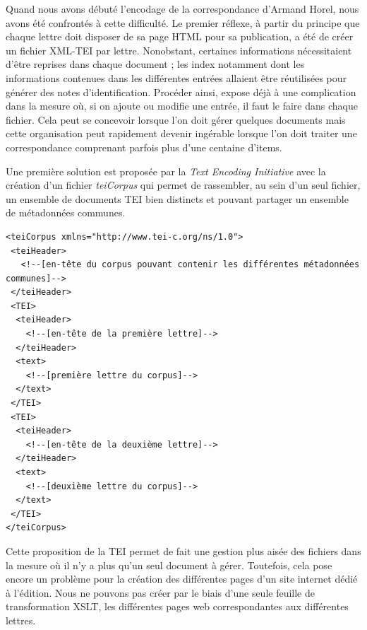 \documentclass[12pt,a4paper]{book} %
\begin{document}
Quand nous avons débuté l'encodage de la correspondance d'Armand Horel, nous avons été confrontés à cette difficulté. Le premier réflexe, à partir du principe  que chaque lettre doit disposer de sa page HTML pour sa publication, a été de créer un fichier XML-TEI par lettre. Nonobstant, certaines informations nécessitaient d'être reprises dans chaque document ; les index notamment dont les informations contenues dans les différentes entrées allaient être réutilisées  pour générer des notes d'identification. Procéder ainsi, expose déjà à une complication dans la mesure où, si on ajoute ou modifie une entrée, il faut le faire dans chaque fichier. Cela peut se concevoir lorsque l'on doit gérer quelques documents mais cette organisation peut rapidement devenir ingérable lorsque l'on doit traiter une correspondance comprenant parfois plus d'une centaine d'items. 

Une première solution est proposée par la \textit{Text Encoding Initiative} avec la création d'un fichier \textit{teiCorpus} qui permet de rassembler, au sein d'un seul fichier, un ensemble de documents TEI bien distincts et pouvant partager un ensemble de métadonnées communes.
\bigskip
 
\begin{lstlisting}
<teiCorpus xmlns="http://www.tei-c.org/ns/1.0">
 <teiHeader>
   <!--[en-tête du corpus pouvant contenir les différentes métadonnées communes]-->
 </teiHeader>
 <TEI>
  <teiHeader>
    <!--[en-tête de la première lettre]-->
  </teiHeader>
  <text>
    <!--[première lettre du corpus]-->
  </text>
 </TEI>
 <TEI>
  <teiHeader>
    <!--[en-tête de la deuxième lettre]-->
  </teiHeader>
  <text>
    <!--[deuxième lettre du corpus]-->
  </text>
 </TEI>
</teiCorpus>
\end{lstlisting}
\bigskip

Cette proposition de la TEI permet de fait une gestion plus aisée des fichiers dans la mesure où il n'y a plus qu'un seul document à gérer. Toutefois, cela pose encore un problème pour la création des différentes pages d'un site internet dédié à l'édition. Nous ne pouvons pas créer par le biais d'une seule feuille de transformation XSLT, les différentes pages web correspondantes aux différentes lettres.
\end{document}
